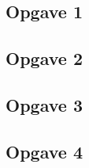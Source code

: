 
\subsection{Opgave 1}

\subsection{Opgave 2}

\subsection{Opgave 3}

\newpage
\subsection{Opgave 4}



